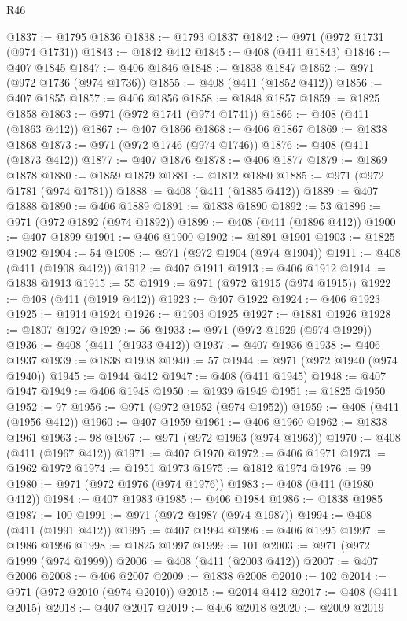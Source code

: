 \begin{lexlean}{R46}
\begin{coremodule}
@1837 := @1795 @1836
@1838 := @1793 @1837
@1842 := @971 (@972 @1731 (@974 @1731))
@1843 := @1842 @412
@1845 := @408 (@411 @1843)
@1846 := @407 @1845
@1847 := @406 @1846
@1848 := @1838 @1847
@1852 := @971 (@972 @1736 (@974 @1736))
@1855 := @408 (@411 (@1852 @412))
@1856 := @407 @1855
@1857 := @406 @1856
@1858 := @1848 @1857
@1859 := @1825 @1858
@1863 := @971 (@972 @1741 (@974 @1741))
@1866 := @408 (@411 (@1863 @412))
@1867 := @407 @1866
@1868 := @406 @1867
@1869 := @1838 @1868
@1873 := @971 (@972 @1746 (@974 @1746))
@1876 := @408 (@411 (@1873 @412))
@1877 := @407 @1876
@1878 := @406 @1877
@1879 := @1869 @1878
@1880 := @1859 @1879
@1881 := @1812 @1880
@1885 := @971 (@972 @1781 (@974 @1781))
@1888 := @408 (@411 (@1885 @412))
@1889 := @407 @1888
@1890 := @406 @1889
@1891 := @1838 @1890
@1892 := 53
@1896 := @971 (@972 @1892 (@974 @1892))
@1899 := @408 (@411 (@1896 @412))
@1900 := @407 @1899
@1901 := @406 @1900
@1902 := @1891 @1901
@1903 := @1825 @1902
@1904 := 54
@1908 := @971 (@972 @1904 (@974 @1904))
@1911 := @408 (@411 (@1908 @412))
@1912 := @407 @1911
@1913 := @406 @1912
@1914 := @1838 @1913
@1915 := 55
@1919 := @971 (@972 @1915 (@974 @1915))
@1922 := @408 (@411 (@1919 @412))
@1923 := @407 @1922
@1924 := @406 @1923
@1925 := @1914 @1924
@1926 := @1903 @1925
@1927 := @1881 @1926
@1928 := @1807 @1927
@1929 := 56
@1933 := @971 (@972 @1929 (@974 @1929))
@1936 := @408 (@411 (@1933 @412))
@1937 := @407 @1936
@1938 := @406 @1937
@1939 := @1838 @1938
@1940 := 57
@1944 := @971 (@972 @1940 (@974 @1940))
@1945 := @1944 @412
@1947 := @408 (@411 @1945)
@1948 := @407 @1947
@1949 := @406 @1948
@1950 := @1939 @1949
@1951 := @1825 @1950
@1952 := 97
@1956 := @971 (@972 @1952 (@974 @1952))
@1959 := @408 (@411 (@1956 @412))
@1960 := @407 @1959
@1961 := @406 @1960
@1962 := @1838 @1961
@1963 := 98
@1967 := @971 (@972 @1963 (@974 @1963))
@1970 := @408 (@411 (@1967 @412))
@1971 := @407 @1970
@1972 := @406 @1971
@1973 := @1962 @1972
@1974 := @1951 @1973
@1975 := @1812 @1974
@1976 := 99
@1980 := @971 (@972 @1976 (@974 @1976))
@1983 := @408 (@411 (@1980 @412))
@1984 := @407 @1983
@1985 := @406 @1984
@1986 := @1838 @1985
@1987 := 100
@1991 := @971 (@972 @1987 (@974 @1987))
@1994 := @408 (@411 (@1991 @412))
@1995 := @407 @1994
@1996 := @406 @1995
@1997 := @1986 @1996
@1998 := @1825 @1997
@1999 := 101
@2003 := @971 (@972 @1999 (@974 @1999))
@2006 := @408 (@411 (@2003 @412))
@2007 := @407 @2006
@2008 := @406 @2007
@2009 := @1838 @2008
@2010 := 102
@2014 := @971 (@972 @2010 (@974 @2010))
@2015 := @2014 @412
@2017 := @408 (@411 @2015)
@2018 := @407 @2017
@2019 := @406 @2018
@2020 := @2009 @2019

\end{coremodule}
\end{lexlean}
